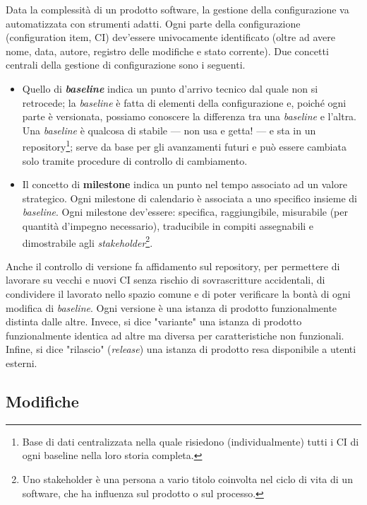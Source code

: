 \documentclass[a4paper]{article}
\begin{document}
		
Data la complessità di un prodotto software, la gestione della configurazione va automatizzata con strumenti adatti. Ogni parte della configurazione (configuration item, CI) dev'essere univocamente identificato (oltre ad avere nome, data, autore, registro delle modifiche e stato corrente). Due concetti centrali della gestione di configurazione sono i seguenti.
		
	\begin{itemize}
		
			
	\item Quello di \textbf{\emph{baseline}} indica un punto d'arrivo tecnico dal quale non si retrocede; la \emph{baseline} è fatta di elementi della configurazione e, poiché ogni parte è versionata, possiamo conoscere la differenza tra una \emph{baseline} e l'altra. Una \emph{baseline} è qualcosa di stabile --- non usa e getta! --- e sta in un repository\footnote{Base di dati centralizzata nella quale risiedono (individualmente) tutti i CI di ogni baseline nella loro storia completa.}; serve da base per gli avanzamenti futuri e può essere cambiata solo tramite procedure di controllo di cambiamento.
			
	\item Il concetto di \textbf{milestone} indica un punto nel tempo associato ad un valore strategico. Ogni milestone di calendario è associata a uno specifico insieme di \emph{baseline}. Ogni milestone dev'essere: specifica, raggiungibile, misurabile (per quantità d'impegno necessario), traducibile in compiti assegnabili e dimostrabile agli \emph{stakeholder}\footnote{Uno stakeholder è una persona a vario titolo coinvolta nel ciclo di vita di un software, che ha influenza sul prodotto o sul processo.}.
		
	\end{itemize}

		
Anche il controllo di versione fa affidamento sul repository, per permettere di lavorare su vecchi e nuovi CI senza rischio di sovrascritture accidentali, di condividere il lavorato nello spazio comune e di poter verificare la bontà di ogni modifica di \emph{baseline}. Ogni versione è una istanza di prodotto funzionalmente distinta dalle altre. Invece, si dice "variante" una istanza di prodotto funzionalmente identica ad altre ma diversa per caratteristiche non funzionali. Infine, si dice "rilascio" (\emph{release}) una istanza di prodotto resa disponibile a utenti esterni.

		
	\subsection{Modifiche}
\end{document}
